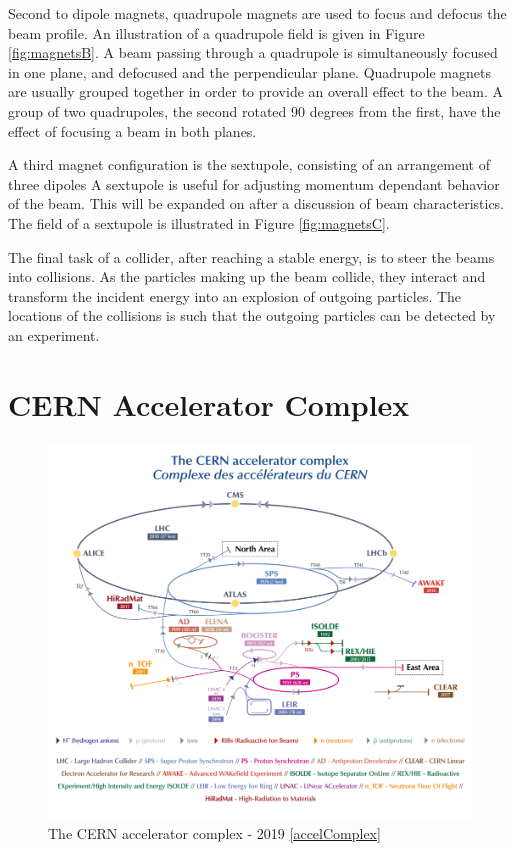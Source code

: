 Second to dipole magnets, quadrupole magnets are used to focus and defocus the beam profile.
An illustration of a quadrupole field is given in Figure \ref{fig:magnetsB}.
A beam passing through a quadrupole is simultaneously focused in one plane, and defocused and the perpendicular plane.
Quadrupole magnets are usually grouped together in order to provide an overall effect to the beam.
A group of two quadrupoles, the second rotated 90 degrees from the first, have the effect of focusing a beam in both planes.

A third magnet configuration is the sextupole, consisting of an arrangement of three dipoles
A sextupole is useful for adjusting momentum dependant behavior of the beam. This will be expanded on after a discussion of beam characteristics.
The field of a sextupole is illustrated in Figure \ref{fig:magnetsC}.

The final task of a collider, after reaching a stable energy, is to steer the beams into collisions.
As the particles making up the beam collide, they interact and transform the incident energy into an explosion of outgoing particles.
The locations of the collisions is such that the outgoing particles can be detected by an experiment.

\section{CERN Accelerator Complex}

\begin{figure}[h!]
\captionsetup[subfigure]{position=b}
\centering
\includegraphics[width=1.0\textwidth]{figures/experiment/accelComplex-small.png}
\caption{The CERN accelerator complex - 2019 \ref{accelComplex}}
\label{fig:accelComplex}
\end{figure}

